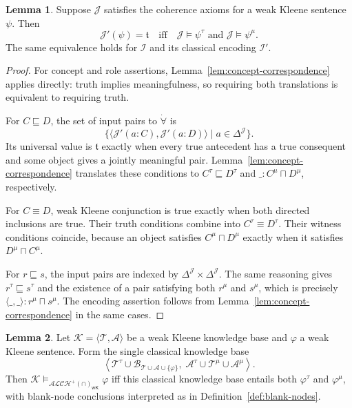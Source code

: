\documentclass[letterpaper]{article} %
\theoremstyle{definition}
\newtheorem{lemma}{Lemma}
\theoremstyle{definition}
\theoremstyle{definition}
\theoremstyle{definition}
\theoremstyle{definition}
\newcommand{\vt}{\mathfrak{t}}
\begin{document}
\begin{lemma}\label{lem:sentence-correspondence}
Suppose $\mathcal{J}$ satisfies the coherence axioms for a weak Kleene sentence $\psi$. Then
\[
\mathcal{J}'(\psi)=\vt\quad\text{iff}\quad
\mathcal{J}\models\psi^{\tau}\text{ and }\mathcal{J}\models\psi^{\mu}.
\]
The same equivalence holds for $\mathcal{I}$ and its classical encoding $\mathcal{I}'$.
\end{lemma}

\begin{proof}
For concept and role assertions, Lemma~\ref{lem:concept-correspondence} applies directly: truth implies meaningfulness, so requiring both translations is equivalent to requiring truth.

For $C\sqsubseteq D$, the set of input pairs to $\dot{\forall}$ is
\[
\{\langle\mathcal{J}'(a:C),\mathcal{J}'(a:D)\rangle\mid a\in\Delta^{\mathcal{J}}\}.
\]
Its universal value is $\vt$ exactly when every true antecedent has a true consequent and some object gives a jointly meaningful pair. Lemma~\ref{lem:concept-correspondence} translates these conditions to $C^{\tau}\sqsubseteq D^{\tau}$ and $\_:C^{\mu}\sqcap D^{\mu}$, respectively.

For $C\equiv D$, weak Kleene conjunction is true exactly when both directed inclusions are true. Their truth conditions combine into $C^{\tau}\equiv D^{\tau}$. Their witness conditions coincide, because an object satisfies $C^{\mu}\sqcap D^{\mu}$ exactly when it satisfies $D^{\mu}\sqcap C^{\mu}$.

For $r\sqsubseteq s$, the input pairs are indexed by $\Delta^{\mathcal{J}}\times\Delta^{\mathcal{J}}$. The same reasoning gives $r^{\tau}\sqsubseteq s^{\tau}$ and the existence of a pair satisfying both $r^{\mu}$ and $s^{\mu}$, which is precisely $\langle\_,\_\rangle:r^{\mu}\sqcap s^{\mu}$. The encoding assertion follows from Lemma~\ref{lem:concept-correspondence} in the same cases.
\end{proof}

\begin{lemma}\label{lem:alh-wk-to-alh}
Let $\mathcal{K}=\langle\mathcal{T},\mathcal{A}\rangle$ be a weak Kleene knowledge base and $\varphi$ a weak Kleene sentence. Form the single classical knowledge base
\[
\left\langle
\mathcal{T}^{\tau}\cup\mathcal{B}_{\mathcal{T}\cup\mathcal{A}\cup\{\varphi\}},\;
\mathcal{A}^{\tau}\cup\mathcal{T}^{\mu}\cup\mathcal{A}^{\mu}
\right\rangle.
\]
Then $\mathcal{K}\models_{\mathcal{ALCH}^{+}(\cap)_{\mathsf{wK}}}\varphi$ iff this classical knowledge base entails both $\varphi^{\tau}$ and $\varphi^{\mu}$, with blank-node conclusions interpreted as in Definition~\ref{def:blank-nodes}.
\end{lemma}
\end{document}
